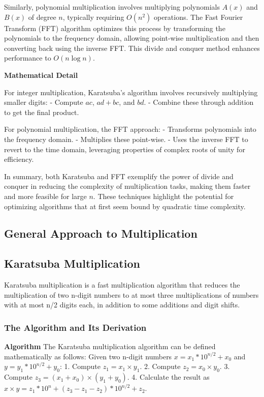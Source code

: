 \documentclass[12pt]{book} %
\begin{document}
Similarly, polynomial multiplication involves multiplying polynomials \(A(x)\) and \(B(x)\) of degree \(n\), typically requiring \(O(n^2)\) operations. The Fast Fourier Transform (FFT) algorithm optimizes this process by transforming the polynomials to the frequency domain, allowing point-wise multiplication and then converting back using the inverse FFT. This divide and conquer method enhances performance to \(O(n \log n)\).

\textbf{Mathematical Detail}

For integer multiplication, Karatsuba's algorithm involves recursively multiplying smaller digits:
- Compute \(ac\), \(ad + bc\), and \(bd\).
- Combine these through addition to get the final product.

For polynomial multiplication, the FFT approach:
- Transforms polynomials into the frequency domain.
- Multiplies these point-wise.
- Uses the inverse FFT to revert to the time domain, leveraging properties of complex roots of unity for efficiency.

In summary, both Karatsuba and FFT exemplify the power of divide and conquer in reducing the complexity of multiplication tasks, making them faster and more feasible for large \(n\). These techniques highlight the potential for optimizing algorithms that at first seem bound by quadratic time complexity.

\subsection{General Approach to Multiplication}

\subsection{Karatsuba Multiplication}
Karatsuba multiplication is a fast multiplication algorithm that reduces the multiplication of two n-digit numbers to at most three multiplications of numbers with at most n/2 digits each, in addition to some additions and digit shifts.
\subsubsection{The Algorithm and Its Derivation}

\textbf{Algorithm}
The Karatsuba multiplication algorithm can be defined mathematically as follows:
Given two n-digit numbers $x = x_1*10^{n/2} + x_0$ and $y = y_1*10^{n/2} + y_0$:
1. Compute $z_1 = x_1 \times y_1$.
2. Compute $z_2 = x_0 \times y_0$.
3. Compute $z_3 = (x_1 + x_0) \times (y_1 + y_0)$.
4. Calculate the result as $x \times y = z_1*10^n + (z_3 - z_1 - z_2)*10^{n/2} + z_2$.
\end{document}
